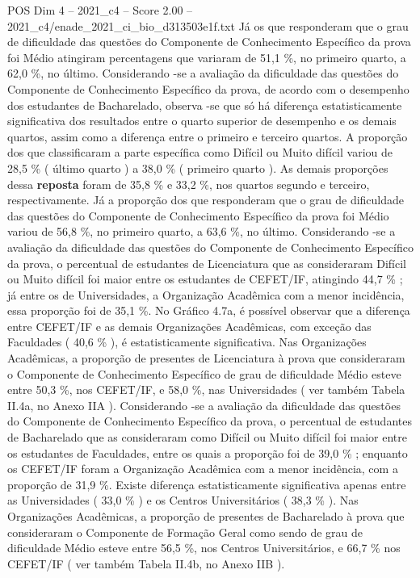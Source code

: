 \begin{textsample}{POS Dim 4 – 2021\_c4 – Score 2.00 – 2021\_c4/enade\_2021\_ci\_bio\_d313503e1f.txt}
Já os que responderam que o grau de dificuldade das questões do Componente de Conhecimento Específico da prova foi Médio atingiram percentagens que variaram de 51,1 \%, no primeiro quarto, a 62,0 \%, no último.
Considerando -se a avaliação da dificuldade das questões do Componente de Conhecimento Específico da prova, de acordo com o desempenho dos estudantes de Bacharelado, observa -se que só há diferença estatisticamente significativa dos resultados entre o quarto superior de desempenho e os demais quartos, assim como a diferença entre o primeiro e terceiro quartos.
A proporção dos que classificaram a parte específica como Difícil ou Muito difícil variou de 28,5 \% ( último quarto ) a 38,0 \% ( primeiro quarto ).
As demais proporções dessa \textbf{reposta} foram de 35,8 \% e 33,2 \%, nos quartos segundo e terceiro, respectivamente.
Já a proporção dos que responderam que o grau de dificuldade das questões do Componente de Conhecimento Específico da prova foi Médio variou de 56,8 \%, no primeiro quarto, a 63,6 \%, no último.
Considerando -se a avaliação da dificuldade das questões do Componente de Conhecimento Específico da prova, o percentual de estudantes de Licenciatura que as consideraram Difícil ou Muito difícil foi maior entre os estudantes de CEFET/IF, atingindo 44,7 \% ; já entre os de Universidades, a Organização Acadêmica com a menor incidência, essa proporção foi de 35,1 \%.
No Gráfico 4.7a, é possível observar que a diferença entre CEFET/IF e as demais Organizações Acadêmicas, com exceção das Faculdades ( 40,6 \% ), é estatisticamente significativa.
Nas Organizações Acadêmicas, a proporção de presentes de Licenciatura à prova que consideraram o Componente de Conhecimento Específico de grau de dificuldade Médio esteve entre 50,3 \%, nos CEFET/IF, e 58,0 \%, nas Universidades ( ver também Tabela II.4a, no Anexo IIA ).
Considerando -se a avaliação da dificuldade das questões do Componente de Conhecimento Específico da prova, o percentual de estudantes de Bacharelado que as consideraram como Difícil ou Muito difícil foi maior entre os estudantes de Faculdades, entre os quais a proporção foi de 39,0 \% ; enquanto os CEFET/IF foram a Organização Acadêmica com a menor incidência, com a proporção de 31,9 \%.
Existe diferença estatisticamente significativa apenas entre as Universidades ( 33,0 \% ) e os Centros Universitários ( 38,3 \% ).
Nas Organizações Acadêmicas, a proporção de presentes de Bacharelado à prova que consideraram o Componente de Formação Geral como sendo de grau de dificuldade Médio esteve entre 56,5 \%, nos Centros Universitários, e 66,7 \% nos CEFET/IF ( ver também Tabela II.4b, no Anexo IIB ).

\end{textsample}
